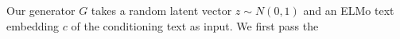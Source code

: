 Our generator $G$ takes a random latent vector $z \sim N(0, 1)$ and an ELMo text embedding $c$ of the conditioning text as input. We first pass the  